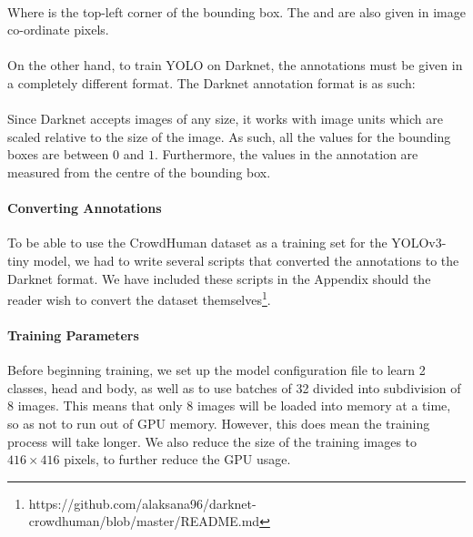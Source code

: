 \paragraph{} Where  is the top-left corner of the bounding box. The  and  are also given in image co-ordinate pixels.

\paragraph{}On the other hand, to train YOLO on Darknet, the annotations must be given in a completely different format. The Darknet annotation format is as such:

\paragraph{}

\paragraph{}Since Darknet accepts images of any size, it works with image units which are scaled relative to the size of the image. As such, all the values for the bounding boxes are between $0$ and $1$. Furthermore, the  values in the annotation are measured from the centre of the bounding box.  

\paragraph{Converting Annotations} To be able to use the CrowdHuman dataset as a training set for the YOLOv3-tiny model, we had to write several scripts that converted the annotations to the Darknet format. We have included these scripts in the Appendix should the reader wish to convert the dataset themselves\footnote{https://github.com/alaksana96/darknet-crowdhuman/blob/master/README.md}.

\paragraph{Training Parameters} Before beginning training, we set up the model configuration file to learn 2 classes, head and body, as well as to use batches of 32 divided into subdivision of 8 images. This means that only 8 images will be loaded into memory at a time, so as not to run out of GPU memory. However, this does mean the training process will take longer. We also reduce the size of the training images to $416\times 416$ pixels, to further reduce the GPU usage.

